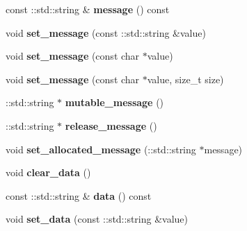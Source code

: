 \begin{DoxyCompactItemize}
\mbox{\label{classcoappbrpc_1_1Error_a9dc400abcdf851cec58bc02ebd2392cc}} 
const \+::std\+::string \& {\bfseries message} () const
\item 
\mbox{\label{classcoappbrpc_1_1Error_a11354fca41ecfb10b1ae201c6232c8fd}} 
void {\bfseries set\+\_\+message} (const \+::std\+::string \&value)
\item 
\mbox{\label{classcoappbrpc_1_1Error_ac7f5e9392eb8c448e87f23903c19c8aa}} 
void {\bfseries set\+\_\+message} (const char $\ast$value)
\item 
\mbox{\label{classcoappbrpc_1_1Error_a62ff01b3ac63dab5cb5b0f9c6973a5de}} 
void {\bfseries set\+\_\+message} (const char $\ast$value, size\+\_\+t size)
\item 
\mbox{\label{classcoappbrpc_1_1Error_a8b7ad03301f0e7ac9651f01144dbf82a}} 
\+::std\+::string $\ast$ {\bfseries mutable\+\_\+message} ()
\item 
\mbox{\label{classcoappbrpc_1_1Error_ab69f3ef2b76905f9843e9871c11a2d90}} 
\+::std\+::string $\ast$ {\bfseries release\+\_\+message} ()
\item 
\mbox{\label{classcoappbrpc_1_1Error_aa481822f68e60ecd862635c6f2e3e397}} 
void {\bfseries set\+\_\+allocated\+\_\+message} (\+::std\+::string $\ast$message)
\item 
\mbox{\label{classcoappbrpc_1_1Error_a223825c785dffa0c6184dba20c474a86}} 
void {\bfseries clear\+\_\+data} ()
\item 
\mbox{\label{classcoappbrpc_1_1Error_af9cfa2e6266aeb1294ffef65da39da96}} 
const \+::std\+::string \& {\bfseries data} () const
\item 
\mbox{\label{classcoappbrpc_1_1Error_a1e65c8c348e8852ef6846621b317f22a}} 
void {\bfseries set\+\_\+data} (const \+::std\+::string \&value)
\item 
\mbox{\label{classcoappbrpc_1_1Error_a71c4fff56dc64991d4b3aecf24778ad2}} 

\end{DoxyCompactItemize}
